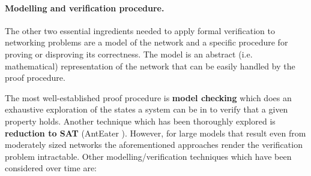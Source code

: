 \paragraph{Modelling and verification procedure.}
The other two essential ingredients needed to apply formal verification to
networking problems are a model of the network and a specific procedure for
proving or disproving its correctness.  The model is an abstract (i.e.
mathematical) representation of the network that can be easily handled by the
proof procedure.

The most well-established proof procedure is \textbf{model checking}
\cite{clarke1999model, mcmillan2003model} which does an exhaustive exploration
of the states a system can be in to verify that a given property holds. Another
technique which has been thoroughly explored is \textbf{reduction to SAT}
(AntEater \cite{mai2011debugging}).  However, for large models that result even
from moderately sized networks the aforementioned approaches render the
verification problem intractable.  Other modelling/verification techniques
which have been considered over time are:
